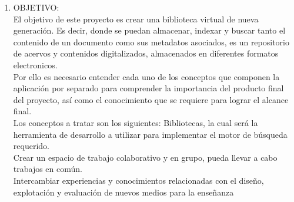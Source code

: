 \begin{enumerate}[1.]
\item OBJETIVO:
\\ El objetivo de este proyecto es crear una biblioteca virtual de nueva generación.
Es decir, donde se puedan almacenar, indexar y buscar tanto el contenido de un documento como sus metadatos asociados, es un repositorio de acervos y contenidos digitalizados, almacenados en diferentes formatos electronicos.
\\ Por ello es necesario entender cada uno de los conceptos que componen la aplicación por separado para comprender la importancia 	del producto final del 	proyecto, así como el conocimiento que se requiere para lograr el alcance final.
\\ Los conceptos a tratar son los siguientes: Bibliotecas, la cual será la herramienta de desarrollo a utilizar para implementar el 	motor de búsqueda requerido. 
\\ Crear un espacio de trabajo colaborativo y en grupo, pueda llevar a cabo trabajos en común.
\\ Intercambiar experiencias y conocimientos relacionadas con el diseño, explotación y evaluación de nuevos medios para la enseñanza


\end{enumerate} 
